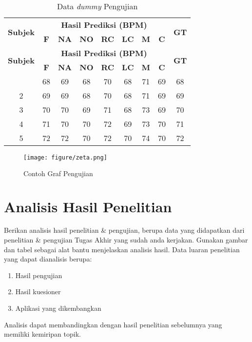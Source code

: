 \begin{longtable}{|c|c|c|c|c|c|c|c|c|}
	\caption{Data \textit{dummy} Pengujian}
	\label{table:4.dummy}\\
	\hline
	\multirow{2}{*}{\textbf{Subjek}} & \multicolumn{7}{|c|}{\textbf{Hasil Prediksi (BPM)}} & \multirow{2}{*}{\textbf{GT}} \\ \cline{2-8}
	& \textbf{F} & \textbf{NA} & \textbf{NO} & \textbf{RC} & \textbf{LC} & \textbf{M} & \textbf{C} & \\ 
	\hline
	\endfirsthead
	\hline
	\multirow{2}{*}{\textbf{Subjek}} & \multicolumn{7}{|c|}{\textbf{Hasil Prediksi (BPM)}} & \multirow{2}{*}{\textbf{GT}} \\ \cline{2-8}
	& \textbf{F} & \textbf{NA} & \textbf{NO} & \textbf{RC} & \textbf{LC} & \textbf{M} & \textbf{C} & \\ 
	\hline
	\endhead
	\hline
	\endfoot
	\hline
	\endlastfoot
	1 & 68 & 69 & 68 & 70 & 68 & 71 & 69 & 68 \\ 
	\hline
	2 & 69 & 69 & 68 & 70 & 68 & 71 & 69 & 69 \\
	\hline
	3 & 70 & 70 & 69 & 71 & 68 & 73 & 69 & 70\\
	\hline
	4 & 71 & 70 & 70 & 72 & 69 & 73 & 70 & 71 \\
	\hline
	5 & 72 & 72 & 70 & 72 & 70 & 74 & 70 & 72 \\
\end{longtable}

\begin{figure}[H]
	\centering
	\texttt{[image: figure/zeta.png]}
	\caption{Contoh Graf Pengujian}
	\label{fig:4.graf}
\end{figure}

\section{Analisis Hasil Penelitian} \label{IV.Analisis}
Berikan analisis hasil penelitian \& pengujian, berupa data yang didapatkan dari penelitian \& pengujian Tugas Akhir yang sudah anda kerjakan. Gunakan gambar dan tabel sebagai alat bantu menjelaskan analisis hasil. Data luaran penelitian yang dapat dianalisis berupa: \par
\begin{enumerate}[noitemsep]
	\item Hasil pengujian
	\item Hasil kuesioner
	\item Aplikasi yang dikembangkan
\end{enumerate}
Analisis dapat membandingkan dengan hasil penelitian sebelumnya yang memiliki kemiripan topik. \par